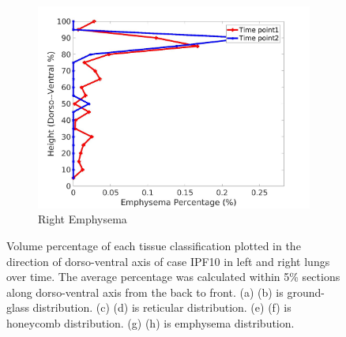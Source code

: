 \begin{figure}[H]
\begin{subfigure}{.42\linewidth}
  \includegraphics[width=\linewidth,trim={{.0\wd0} {.0\wd0} {.0\wd0} {.0\wd0}},clip]{Appendix/Image_AppexA/DorsoToVentral/IPF10RightLungEmphysemaDiseaseDorsoToVentral.jpg}
  \caption{Right Emphysema}
  \label{fig:IPF10DiseaseDorsoToVentral-h}
\end{subfigure}
\caption{Volume percentage of each tissue classification plotted in the direction of dorso-ventral axis of case IPF10 in left and right lungs over time. The average percentage was calculated within 5\% sections along dorso-ventral axis from the back to front. (a) (b) is ground-glass distribution. (c) (d) is reticular distribution. (e) (f) is honeycomb distribution. (g) (h) is emphysema distribution.}
\label{fig:IPF10DiseaseDorsoToVentral}
\end{figure}

